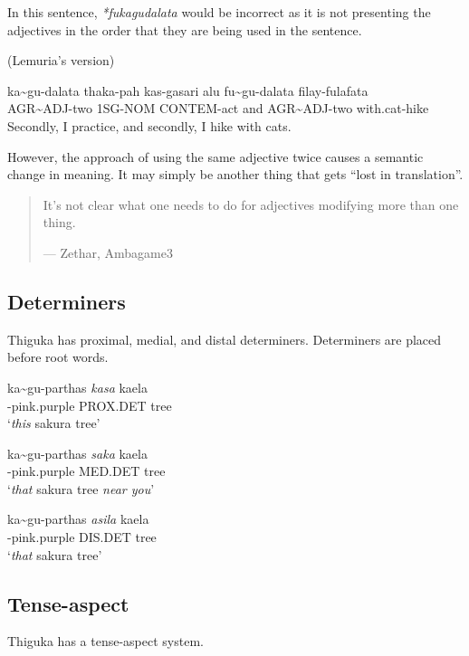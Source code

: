 In this sentence, \textit{*fukagudalata} would be incorrect as it is not presenting the adjectives in the order that they are being used in the sentence.

(Lemuria's version)
\begin{exe}
\ex{} \gll{}ka\~{}gu-dalata thaka-pah kas-gasari alu fu\~{}gu-dalata filay-fulafata\\
            AGR\~{}ADJ-two  1SG-NOM   CONTEM-act and AGR\~{}ADJ-two  with.cat-hike\\
      \glt{}Secondly, I practice, and secondly, I hike with cats.
\end{exe}

However, the approach of using the same adjective twice causes a semantic change in meaning.
It may simply be another thing that gets ``lost in translation''.

\begin{quote}
    It’s not clear what one needs to do for adjectives modifying more than one thing.

    --- Zethar, Ambagame3
\end{quote}

\subsection{Determiners}
Thiguka has proximal, medial, and distal determiners. Determiners are placed before root words. 

\begin{exe}
    \ex{} \gll{}ka\~{}{}gu-parthas \emph{kasa} kaela\\
    \agradj{}-pink.purple PROX.DET tree\\
    \glt{}`\emph{this} sakura tree'
\end{exe}

\begin{exe}
    \ex{} \gll{}ka\~{}{}gu-parthas \emph{saka} kaela\\
    \agradj{}-pink.purple MED.DET tree\\
    \glt{}`\emph{that} sakura tree \emph{near you}'
\end{exe}

\begin{exe}
    \ex{} \gll{}ka\~{}{}gu-parthas \emph{asila} kaela\\
    \agradj{}-pink.purple DIS.DET tree\\
    \glt{}`\emph{that} sakura tree'
\end{exe}

\subsection{Tense-aspect}
Thiguka has a tense-aspect system.

